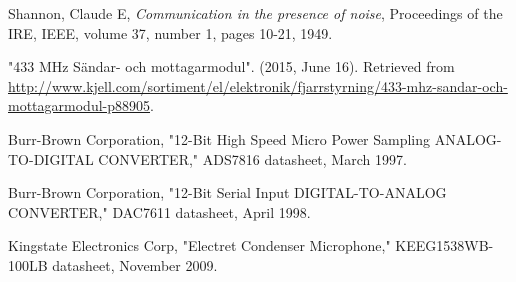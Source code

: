 \documentclass[a4paper,10pt]{article}
\begin{document}
\begin{thebibliography}{hejhej}

    {Shannon, Claude E,
    \emph{Communication in the presence of noise},
    Proceedings of the IRE, IEEE,
    volume 37,
    number 1,
    pages 10-21,
    1949.
}

 "433 MHz Sändar- och mottagarmodul". (2015, June 16). 
Retrieved from \url{http://www.kjell.com/sortiment/el/elektronik/fjarrstyrning/433-mhz-sandar-och-mottagarmodul-p88905}.

 Burr-Brown Corporation, "12-Bit High Speed Micro Power Sampling 
ANALOG-TO-DIGITAL CONVERTER," {ADS7816} datasheet, March 1997.

 Burr-Brown Corporation, "12-Bit Serial Input DIGITAL-TO-ANALOG 
CONVERTER," {DAC7611} datasheet, April 1998.

 Kingstate Electronics Corp, "Electret Condenser Microphone,"
KEEG1538WB-100LB datasheet, November 2009.

\end{thebibliography}
\end{document}
